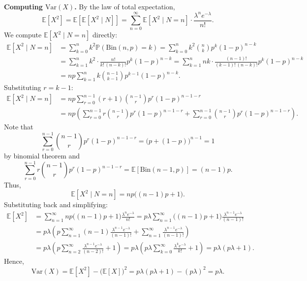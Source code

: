 \documentclass[a4paper,12pt]{article}
\begin{document}
\textbf{Computing $\mathrm{Var}(X)$.} By the law of total expectation,
\[
    \mathbb{E}[X^2] = \mathbb{E}[\mathbb{E}[X^2 \mid N]] = \sum_{n=0}^{\infty} \mathbb{E}[X^2 \mid N=n] \cdot \frac{\lambda^n e^{-\lambda}}{n!}.
\]
We compute $\mathbb{E}[X^2 \mid N=n]$ directly:
\begin{align*}
    \mathbb{E}[X^2 \mid N=n] &= \sum_{k=0}^n k^2 \mathbb{P} (\mathrm{Bin}(n, p) = k) = \sum_{k=0}^{n} k^2 \binom{n}{k} p^k (1-p)^{n-k} \\
	&= \sum_{k=1}^{n} k^2 \cdot \frac{n!}{k!\,(n-k)!} p^k (1-p)^{n-k} = \sum_{k=1}^{n} nk \cdot \frac{(n-1)!}{(k-1)!\,(n-k)!} p^k (1-p)^{n-k} \\
    &= np \sum_{k=1}^{n} k \binom{n-1}{k-1} p^{k-1}(1-p)^{n-k}.
\end{align*}
Substituting $r = k-1$:
\begin{align*}
    \mathbb{E}[X^2 \mid N=n] &= np \sum_{r=0}^{n-1} (r+1) \binom{n-1}{r} p^r (1-p)^{n-1-r} \\
    &= np \left( \sum_{r=0}^{n-1} r \binom{n-1}{r} p^r (1-p)^{n-1-r} + \sum_{r=0}^{n-1} \binom{n-1}{r} p^r (1-p)^{n-1-r} \right).
\end{align*}
Note that
\[
	\sum_{r=0}^{n-1} \binom{n-1}{r} p^r (1-p)^{n-1-r} = \bigl(p+(1-p)\bigr)^{n-1} = 1
\]
by binomial theorem and
\[
	\sum_{r=0}^{n-1} r \binom{n-1}{r} p^r (1-p)^{n-1-r} = \mathbb{E}[\mathrm{Bin}(n-1,p)] = (n-1)p.
\]
Thus,
\[
    \mathbb{E}[X^2 \mid N=n] = np\bigl((n-1)p + 1\bigr).
\]
Substituting back and simplifying:
\begin{align*}
    \mathbb{E}[X^2] &= \sum_{n=1}^{\infty} np\bigl((n-1)p+1\bigr) \frac{\lambda^n e^{-\lambda}}{n!} = p\lambda \sum_{n=1}^{\infty} \bigl((n-1)p+1\bigr) \frac{\lambda^{n-1} e^{-\lambda}}{(n-1)!} \\
    &= p\lambda \left( p \sum_{n=1}^{\infty} (n-1) \frac{\lambda^{n-1} e^{-\lambda}}{(n-1)!} + \sum_{n=1}^{\infty} \frac{\lambda^{n-1} e^{-\lambda}}{(n-1)!} \right) \\
    &= p\lambda \left( p \sum_{n=2}^{\infty} \frac{\lambda^{n-1} e^{-\lambda}}{(n-2)!} + 1 \right) = p\lambda \left( p\lambda \sum_{k=0}^{\infty} \frac{\lambda^k e^{-\lambda}}{k!} + 1 \right) = p\lambda(p\lambda + 1).
\end{align*}
Hence,
\[
    \mathrm{Var}(X) = \mathbb{E}[X^2] - \bigl(\mathbb{E}[X]\bigr)^2 = p\lambda(p\lambda+1) - (p\lambda)^2 = p\lambda.
\]
\end{document}
